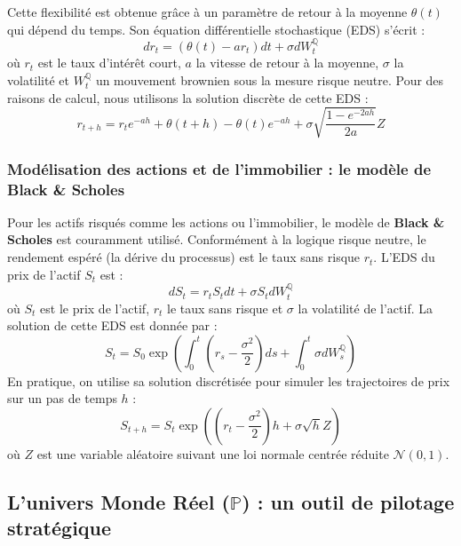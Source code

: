 Cette flexibilité est obtenue grâce à un paramètre de retour à la moyenne $\theta(t)$ qui dépend du temps. Son équation différentielle stochastique (EDS) s'écrit :
\begin{equation}
    dr_t = (\theta(t) - ar_t)dt + \sigma dW^{\mathbb{Q}}_t
    \label{eq:hull_white}
\end{equation}
où $r_t$ est le taux d’intérêt court, $a$ la vitesse de retour à la moyenne, $\sigma$ la volatilité et $W^{\mathbb{Q}}_t$ un mouvement brownien sous la mesure risque neutre. Pour des raisons de calcul, nous utilisons la solution discrète de cette EDS :
\begin{equation}
    r_{t+h} = r_t e^{-ah} + \theta(t+h) - \theta(t)e^{-ah} + \sigma \sqrt{\frac{1 - e^{-2ah}}{2a}} Z
    \label{eq:hull_white_discrete}
\end{equation}

\subsubsection{Modélisation des actions et de l'immobilier : le modèle de Black \& Scholes}
Pour les actifs risqués comme les actions ou l'immobilier, le modèle de \textbf{Black \& Scholes} est couramment utilisé. Conformément à la logique risque neutre, le rendement espéré (la dérive du processus) est le taux sans risque $r_t$. L'EDS du prix de l'actif $S_t$ est :
\begin{equation}
    dS_t = r_t S_t dt + \sigma S_t dW^{\mathbb{Q}}_t
    \label{eq:black_scholes_q}
\end{equation}
où $S_t$ est le prix de l'actif, $r_t$ le taux sans risque et $\sigma$ la volatilité de l'actif. La solution de cette EDS est donnée par :
\begin{equation}
    S_t = S_0 \exp\left( \int_0^t \left(r_s - \frac{\sigma^2}{2}\right)ds + \int_0^t \sigma dW^{\mathbb{Q}}_s \right)
\end{equation}
En pratique, on utilise sa solution discrétisée pour simuler les trajectoires de prix sur un pas de temps $h$ :
\begin{equation}
    S_{t+h} = S_t \exp\left( \left(r_t - \frac{\sigma^2}{2}\right)h + \sigma\sqrt{h}Z \right)
    \label{eq:black_scholes_q_discrete}
\end{equation}
où $Z$ est une variable aléatoire suivant une loi normale centrée réduite $\mathcal{N}(0,1)$.

\subsection{\texorpdfstring{L'univers Monde Réel ($\mathbb{P}$)}{L'univers Monde Réel (P)} : un outil de pilotage stratégique}


